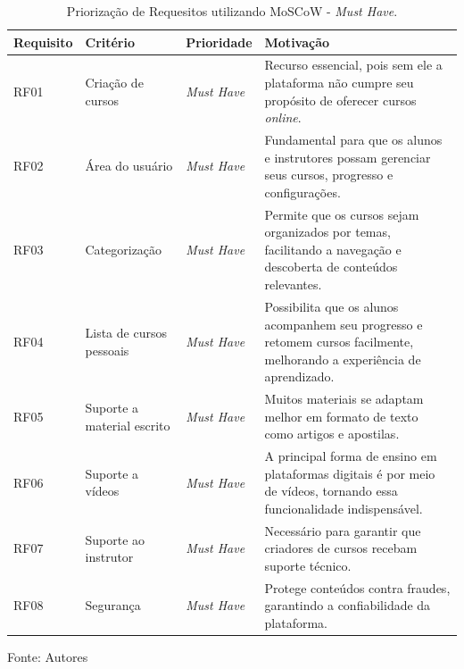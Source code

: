 \begin{apendicesenv}
\begin{table}[h]
    \centering
    \caption{Priorização de Requesitos utilizando MoSCoW - \textit{Must Have}.}
    \label{tab:priorizacao_moscow}
    \begin{adjustbox}{width=\textwidth}
        \begin{tabular}{|p{2.5cm}|p{5cm}|p{5cm}|p{4cm}|}
        \hline
        \textbf{Requisito} & \textbf{Critério} & \textbf{Prioridade} & \textbf{Motivação} \\
        \hline
        RF01 & Criação de cursos & \textit{Must Have} & Recurso essencial, pois sem ele a plataforma não cumpre seu propósito de oferecer cursos \textit{online}. \\
        \hline
        RF02 & Área do usuário & \textit{Must Have} & Fundamental para que os alunos e instrutores possam gerenciar seus cursos, progresso e configurações. \\
        \hline
        RF03 & Categorização & \textit{Must Have} & Permite que os cursos sejam organizados por temas, facilitando a navegação e descoberta de conteúdos relevantes. \\
        \hline
        RF04 & Lista de cursos pessoais & \textit{Must Have} & Possibilita que os alunos acompanhem seu progresso e retomem cursos facilmente, melhorando a experiência de aprendizado. \\
        \hline
        RF05 & Suporte a material escrito & \textit{Must Have} & Muitos materiais se adaptam melhor em formato de texto como artigos e apostilas. \\
        \hline
        RF06 & Suporte a vídeos & \textit{Must Have} & A principal forma de ensino em plataformas digitais é por meio de vídeos, tornando essa funcionalidade indispensável. \\
        \hline
        RF07 & Suporte ao instrutor & \textit{Must Have} & Necessário para garantir que criadores de cursos recebam suporte técnico. \\
        \hline
        RF08 & Segurança & \textit{Must Have} & Protege conteúdos contra fraudes, garantindo a confiabilidade da plataforma. \\
        \hline
    \end{tabular}
\end{adjustbox}

\vspace{5mm}
{\footnotesize Fonte: Autores} 
\end{table}



\end{apendicesenv}
